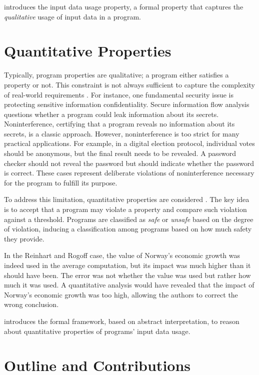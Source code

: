  introduces the input data usage property, a formal property that captures the \emph{qualitative} usage of input data in a program.

\section{Quantitative Properties}

Typically, program properties are qualitative; a program either satisfies a property or not.
This constraint is not always sufficient to capture the complexity of real-world requirements .
For instance, one fundamental security issue is protecting sensitive information confidentiality.
Secure information flow analysis questions whether a program could leak information about its secrets.
Noninterference, certifying that a program reveals no information about its secrets, is a classic approach.
However, noninterference is too strict for many practical applications.
For example, in a digital election protocol, individual votes should be anonymous, but the final result needs to be revealed.
A password checker should not reveal the password but should indicate whether the password is correct.
These cases represent deliberate violations of noninterference necessary for the program to fulfill its purpose.

To address this limitation, quantitative properties are considered .
The key idea is to accept that a program may violate a property and compare such violation against a threshold.
Programs are classified as \emph{safe} or \emph{unsafe} based on the degree of violation, inducing a classification among programs based on how much safety they provide.

In the Reinhart and Rogoff case, the value of Norway's economic growth was indeed used in the average computation, but its impact was much higher than it should have been.
The error was not whether the value was used but rather how much it was used.
A quantitative analysis would have revealed that the impact of Norway's economic growth was too high, allowing the authors to correct the wrong conclusion.

 introduces the formal framework, based on abstract interpretation, to reason about quantitative properties of programs' input data usage.

\section{Outline and Contributions}

